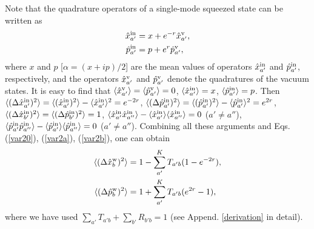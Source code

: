 \documentclass[9pt,twocolumn,twoside]{osajnl}
\begin{document}
Note that the quadrature operators of a single-mode squeezed state can be written as
\begin{align}
\label{quadrature}
\hat{x}_{a'}^{\rm{in}} &= x + e^{-r} \hat{x}^{\rm{v}}_{a'},\\ \nonumber
\hat{p}_{a'}^{\rm{in}} &= p + e^{r} \hat{p}^{\rm{v}}_{a'},
\end{align}
where $x$ and $p$ [$\alpha = (x + i p)/2$] are the mean values of operators $\hat{x}_{a'}^{\rm{in}}$ and $\hat{p}_{a'}^{\rm{in}}$, respectively, and the operators $\hat{x}^{\rm{v}}_{a'}$ and $\hat{p}^{\rm{v}}_{a'}$ denote the  quadratures of the vacuum states. It is easy to find that $\langle \hat{x}_{a'}^{\rm{v}} \rangle =\langle \hat{p}_{a'}^{\rm{v}} \rangle = 0$,
$\langle \hat{x}_{a'}^{\rm{in}} \rangle = x$,
$\langle \hat{p}_{a'}^{\rm{in}} \rangle = p$.
Then
$\langle (\Delta \hat{x}_{a'}^{\rm{in}})^2 \rangle = \langle (\hat{x}_{a'}^{\rm{in}})^2 \rangle - \langle \hat{x}_{a'}^{\rm{in}} \rangle^2 = e^{-2r}$, $\langle (\Delta \hat{p}_{a'}^{\rm{in}})^2 \rangle = \langle (\hat{p}_{a'}^{\rm{in}})^2 \rangle - \langle \hat{p}_{a'}^{\rm{in}} \rangle^2 = e^{2r}$,
$\langle (\Delta \hat{x}_{b'}^{\rm{in}})^2 \rangle = \langle (\Delta \hat{p}_{b'}^{\rm{in}})^2 \rangle = 1$, $\langle \hat{x}_{a'}^{\rm{in}} \hat{x}_{a''}^{\rm{in}} \rangle - \langle \hat{x}_{a'}^{\rm{in}}\rangle \langle \hat{x}_{a''}^{\rm{in}} \rangle = 0$ ($a' \neq a''$), $\langle \hat{p}_{a'}^{\rm{in}} \hat{p}_{a''}^{\rm{in}} \rangle - \langle \hat{p}_{a'}^{\rm{in}}\rangle \langle \hat{p}_{a''}^{\rm{in}} \rangle = 0$ ($a' \neq a''$). Combining all these arguments and Eqs. (\ref{var20}), (\ref{var2a}), (\ref{var2b}), one can obtain
\begin{align}
\label{sqz1xb}
\langle(\Delta \hat{x}_b^{\rm{w}})^2 \rangle &= 1 - \sum_{a'}^{K}T_{a'b} (1 - e^{-2r}), \\ \nonumber
\langle(\Delta \hat{p}_b^{\rm{w}})^2 \rangle &= 1 + \sum_{a'}^{K}T_{a'b} ( e^{2r} - 1),
\end{align}
where we have used $\sum_{a'} T_{a'b} + \sum_{b'} R_{b'b} = 1$ (see Append. \ref{derivation} in detail).
\end{document}
